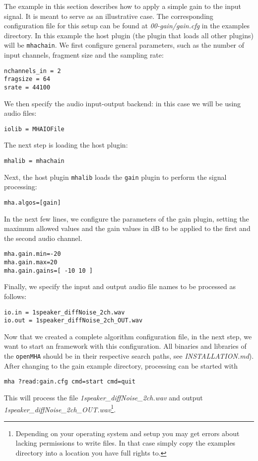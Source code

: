 The example in this section describes how to apply a simple gain to the input signal.
It is meant to serve as an illustrative case. The corresponding configuration
file for this setup can be found at \emph{00-gain/gain.cfg} in the examples directory.
%
In this example the host plugin (the plugin that loads all other
plugins) will be \verb!mhachain!.
%
We first configure general parameters, such as the number of input 
channels, fragment size and the sampling rate:
\begin{verbatim}
nchannels_in = 2
fragsize = 64
srate = 44100
\end{verbatim}
%
We then specify the audio input-output backend:
in this case we will be using audio files:
\begin{verbatim}
iolib = MHAIOFile
\end{verbatim}
%
The next step is loading the host plugin:
\begin{verbatim}
mhalib = mhachain
\end{verbatim}
%
Next, the host plugin \verb!mhalib! loads the \verb!gain! plugin
to perform the signal processing:
\begin{verbatim}
mha.algos=[gain]
\end{verbatim}
%
In the next few lines, we configure the parameters of the gain
plugin, setting the maximum allowed values and the gain values in dB to be applied to the first and the second audio channel. 
%
\begin{verbatim}
mha.gain.min=-20
mha.gain.max=20
mha.gain.gains=[ -10 10 ]
\end{verbatim}

%
Finally, we specify the input and output audio file names to be processed as 
follows:
\begin{verbatim}
io.in = 1speaker_diffNoise_2ch.wav
io.out = 1speaker_diffNoise_2ch_OUT.wav
\end{verbatim}

Now that we created a complete \mha{} algorithm configuration file,
in the next step, we want to start an \mha{} framework with this configuration.
%
All binaries and libraries of the \verb!openMHA! should be in their respective
search paths, see \emph{INSTALLATION.md}). After changing to the gain example
directory, \mha{} processing can be started with
\begin{verbatim}
mha ?read:gain.cfg cmd=start cmd=quit
\end{verbatim}
%
This will process the file \emph{1speaker\_diffNoise\_2ch.wav} and output \\
\emph{1speaker\_diffNoise\_2ch\_OUT.wav}\footnote{Depending on your operating
  system and setup you may get errors about lacking permissions to write files.
  In that case simply copy the examples directory into a location you have full
  rights to.}.

